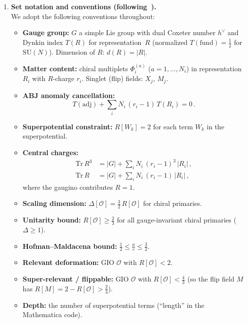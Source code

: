 \documentclass[12pt]{article}
\begin{document}
\begin{enumerate}[label=\textbf{0.\arabic*}]
\item \textbf{Set notation and conventions (following~\cite{CMNS}).} \\
  We adopt the following conventions throughout:
  \begin{itemize}
    \item \textbf{Gauge group:} $G$ a simple Lie group with dual Coxeter number $h^\vee$ and Dynkin index $T(R)$ for representation~$R$ (normalized $T(\mathrm{fund}) = \tfrac{1}{2}$ for $\mathrm{SU}(N)$). Dimension of $R$: $d(R) = |R|$.
    \item \textbf{Matter content:} chiral multiplets $\Phi_i^{(a)}$ ($a = 1,\ldots, N_i$) in representation $R_i$ with $R$-charge $r_i$. Singlet (flip) fields: $X_j$, $M_j$.
    \item \textbf{ABJ anomaly cancellation:}
    \begin{equation}\label{eq:ABJ}
      T(\mathrm{adj}) + \sum_i N_i\,(r_i - 1)\,T(R_i) = 0\,.
    \end{equation}
    \item \textbf{Superpotential constraint:} $R[W_k] = 2$ for each term $W_k$ in the superpotential.
    \item \textbf{Central charges:}
    \begin{align}
      \mathrm{Tr}\,R^3 &= |G| + \sum_i N_i\,(r_i-1)^3\,|R_i|\,, \\
      \mathrm{Tr}\,R &= |G| + \sum_i N_i\,(r_i-1)\,|R_i|\,,
    \end{align}
    where the gaugino contributes $R=1$.
    \item \textbf{Scaling dimension:} $\Delta[\mathcal{O}] = \frac{3}{2}\,R[\mathcal{O}]$ for chiral primaries.
    \item \textbf{Unitarity bound:} $R[\mathcal{O}] \geq \frac{2}{3}$ for all gauge-invariant chiral primaries ($\Delta \geq 1$).
    \item \textbf{Hofman--Maldacena bound:} $\frac{1}{2} \leq \frac{a}{c} \leq \frac{3}{2}$.
    \item \textbf{Relevant deformation:} GIO $\mathcal{O}$ with $R[\mathcal{O}] < 2$.
    \item \textbf{Super-relevant / flippable:} GIO $\mathcal{O}$ with $R[\mathcal{O}] < \frac{4}{3}$ (so the flip field $M$ has $R[M] = 2 - R[\mathcal{O}] > \frac{2}{3}$).
    \item \textbf{Depth:} the number of superpotential terms (``length'' in the Mathematica code).
  \end{itemize}


\end{enumerate}
\end{document}
